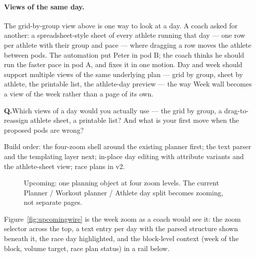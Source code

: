 \documentclass[11pt]{article}
\newcommand{\question}[1]{\par\vspace{4pt}%
  \noindent\colorbox{kailosoft}{\parbox{\dimexpr\linewidth-2\fboxsep}{%
  \small\textcolor{kailoaccent}{\textbf{Q.}}\;#1}}\par\vspace{3pt}}
\begin{document}
\paragraph{Views of the same day.} The grid-by-group view above is one way
to look at a day. A coach asked for another: a spreadsheet-style sheet of
every athlete running that day --- one row per athlete with their group and
pace --- where dragging a row moves the athlete between pods. The automation
put Peter in pod B; the coach thinks he should run the faster pace in pod A,
and fixes it in one motion. Day and week should support multiple views of
the same underlying plan --- grid by group, sheet by athlete, the printable
list, the athlete-day preview --- the way Week wall becomes a view of the
week rather than a page of its own.
\question{Which views of a day would you actually use --- the grid by group,
a drag-to-reassign athlete sheet, a printable list? And what is your first
move when the proposed pods are wrong?}

Build order: the four-zoom shell around the existing planner first; the
text parser and the templating layer next; in-place day editing with
attribute variants and the athlete-sheet view; race plans in v2.

\begin{figure}[H]
\centering
{}
\caption{Upcoming: one planning object at four zoom levels. The current
Planner / Workout planner / Athlete day split becomes zooming, not separate
pages.}
\label{fig:zoom}
\end{figure}

Figure~\ref{fig:upcomingwire} is the week zoom as a coach would see it: the
zoom selector across the top, a text entry per day with the parsed structure
shown beneath it, the race day highlighted, and the block-level context
(week of the block, volume target, race plan status) in a rail below.
\end{document}
